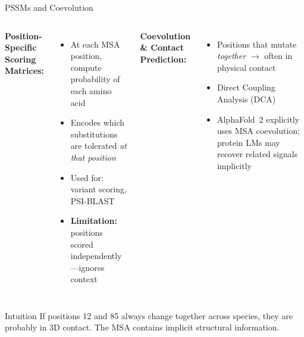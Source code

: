 \documentclass[aspectratio=169,10pt]{beamer}
\begin{document}
\begin{frame}{PSSMs and Coevolution}
\begin{columns}[T]
\textbf{Position-Specific Scoring Matrices:}
{\small
\begin{itemize}\itemsep0em
    \item At each MSA position, compute probability of each amino acid
    \item Encodes which substitutions are tolerated \emph{at that position}
    \item Used for: variant scoring, PSI-BLAST
    \item \textbf{Limitation:} positions scored independently---ignores context
\end{itemize}
}

\textbf{Coevolution \& Contact Prediction:}
{\small
\begin{itemize}\itemsep0em
    \item Positions that mutate \emph{together} $\to$ often in physical contact
    \item Direct Coupling Analysis (DCA)
    \item \alert{AlphaFold~2 explicitly uses} MSA coevolution; protein LMs may recover related signals implicitly
\end{itemize}
}
\end{columns}

\pause
\vspace{0.2em}
\begin{block}{Intuition}
{\small If positions 12 and 85 always change together across species, they are probably in 3D contact. The MSA contains implicit structural information.}
\end{block}
\end{frame}
\end{document}
